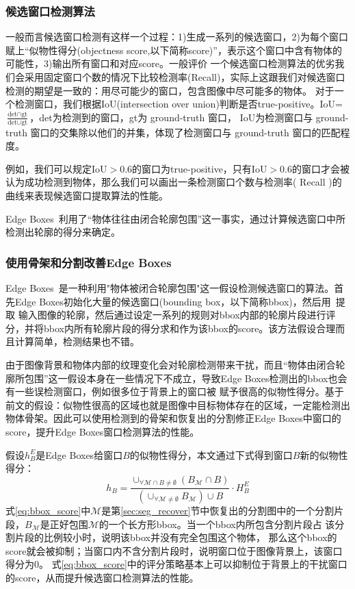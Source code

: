 \documentclass[UTF8]{ctexart}
\numberwithin{equation}{section} %
\numberwithin{table}{section} %
\begin{document}
\subsubsection{候选窗口检测算法}
一般而言候选窗口检测有这样一个过程：1)生成一系列的候选窗口，2)为每个窗口赋上“似物性得分(objectness score,以下简称score)”，表示这个窗口中含有物体的可能性，3)输出所有窗口和对应score。一般评价
一个候选窗口检测算法的优劣我们会采用固定窗口个数的情况下比较检测率(Recall)，实际上这跟我们对候选窗口检测的期望是一致的：用尽可能少的窗口，包含图像中尽可能多的物体。
对于一个检测窗口，我们根据IoU(intersection over union)判断是否true-positive。IoU=$\frac{\text{det}\cap \text{gt}}{\text{det}\cup \text{gt}}$，det为检测到的窗口，gt为 ground-truth 窗口，
IoU为检测窗口与 ground-truth 窗口的交集除以他们的并集，体现了检测窗口与 ground-truth 窗口的匹配程度。

例如，我们可以规定IoU$>$0.6的窗口为true-positive，只有IoU$>$0.6的窗口才会被认为成功检测到物体，那么我们可以画出一条检测窗口个数与检测率( Recall )的曲线来表现候选窗口提取算法的性能。

Edge Boxes~\cite{zitnick2014edge}利用了“物体往往由闭合轮廓包围”这一事实，通过计算候选窗口中所检测出轮廓的得分来确定。

\subsubsection{使用骨架和分割改善Edge Boxes}
Edge Boxes~\cite{zitnick2014edge}是一种利用"物体被闭合轮廓包围"这一假设检测候选窗口的算法。首先Edge Boxes初始化大量的候选窗口(bounding box，以下简称bbox)，然后用~\cite{dollar2015fast}提取
输入图像的轮廓，然后通过设定一系列的规则对bbox内部的轮廓片段进行评分，并将bbox内所有轮廓片段的得分求和作为该bbox的score。该方法假设合理而且计算简单，检测结果也不错。

由于图像背景和物体内部的纹理变化会对轮廓检测带来干扰，而且“物体由闭合轮廓所包围”这一假设本身在一些情况下不成立，导致Edge Boxes检测出的bbox也会有一些误检测窗口，例如很多位于背景上的窗口被
赋予很高的似物性得分。基于前文的假设：似物性很高的区域也就是图像中目标物体存在的区域，一定能检测出物体骨架。因此可以使用检测到的骨架和恢复出的分割修正Edge Boxes中窗口的score，提升Edge Boxes窗口检测算法的性能。

假设$h_B^E$是Edge Boxes给窗口$B$的似物性得分，本文通过下式得到窗口$B$新的似物性得分：
\begin{equation}
h_B = \frac{\cup_{\forall \mathcal{M}\cap B \neq \emptyset}(B_{\mathcal{M}}\cap B)}{(\cup_{\forall \mathcal{M}\neq\emptyset}B_{\mathcal{M}})\cup B} \cdot H_B^E
\label{eq:bbox_score}
\end{equation}
式\ref{eq:bbox_score}中$\mathcal{M}$是第\ref{sec:seg_recover}节中恢复出的分割图中的一个分割片段，$B_{\mathcal{M}}$是正好包围$\mathcal{M}$的一个长方形bbox。当一个bbox内所包含分割片段占
该分割片段的比例较小时，说明该bbox并没有完全包围这个物体，
那么这个bbox的score就会被抑制；当窗口内不含分割片段时，说明窗口位于图像背景上，该窗口得分为0。
式\ref{eq:bbox_score}中的评分策略基本上可以抑制位于背景上的干扰窗口的score，从而提升候选窗口检测算法的性能。
\end{document}
